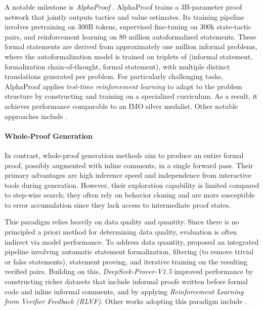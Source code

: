 \documentclass[11pt]{article}
\numberwithin{equation}{section}
\begin{document}
A notable milestone is \textit{AlphaProof} \cite{hubert2025olympiad}.  AlphaProof trains a 3B-parameter proof network that jointly outputs tactics and value estimates. Its training pipeline involves pretraining on 300B tokens, supervised fine-tuning on 300k state-tactic pairs, and reinforcement learning on 80 million autoformalized statements. These formal statements are derived from approximately one million informal problems, where the autoformalization model is trained on triplets of (informal statement, formalization chain-of-thought, formal statement), with multiple distinct translations generated per problem. For particularly challenging tasks, AlphaProof applies \textit{test-time reinforcement learning} to adapt to the problem structure by constructing and training on a specialized curriculum. As a result, it achieves performance comparable to an IMO silver medalist. Other notable approaches include \cite{jiang2022thor, polu2023formal, wang-etal-2023-dt, yang2023leandojo, xin2025bfs, li2024hunyuanprover,xin2025scaling}.

\paragraph{Whole-Proof Generation}
In contrast, whole-proof generation methods aim to produce an entire formal proof, possibly augmented with inline comments, in a single forward pass. Their primary advantages are high inference speed and independence from interactive tools during generation. However, their exploration capability is limited compared to step-wise search; they often rely on behavior cloning and are more susceptible to error accumulation since they lack access to intermediate proof states.

This paradigm relies heavily on data quality and quantity. Since there is no principled a priori method for determining data quality, evaluation is often indirect via model performance. To address data quantity, \cite{xin2024deepseek} proposed an integrated pipeline involving automatic statement formalization, filtering (to remove trivial or false statements), statement proving, and iterative training on the resulting verified pairs. Building on this, \textit{DeepSeek-Prover-V1.5} \cite{xin2025deepseekproverv} improved performance by constructing richer datasets that include informal proofs written before formal code and inline informal comments, and by applying \textit{Reinforcement Learning from Verifier Feedback (RLVF)}. Other works adopting this paradigm include \cite{first2023baldur, azerbayev2024llemma, ying2024internlm, dong2025stp, zhang2025leanabell,wang2025kimina,lin2025goedel}.
\end{document}

